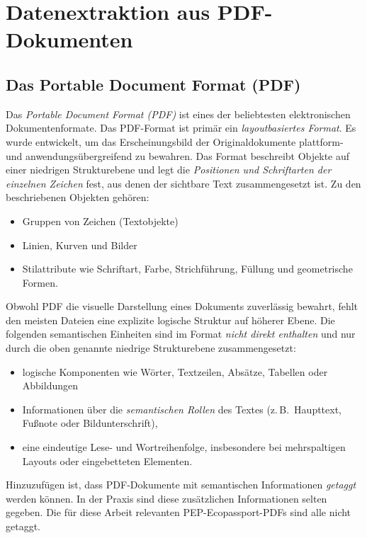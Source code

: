 \section{Datenextraktion aus PDF-Dokumenten}

\subsection{Das Portable Document Format (PDF)}

Das \emph{Portable Document Format (PDF)} ist eines der beliebtesten elektronischen Dokumentenformate.  
Das PDF-Format ist primär ein \emph{layoutbasiertes Format}. 
Es wurde entwickelt, um das Erscheinungsbild der Originaldokumente plattform- und anwendungsübergreifend zu bewahren. \cite{Lovegrove1995}
Das Format beschreibt Objekte auf einer niedrigen Strukturebene und legt die \emph{Positionen und Schriftarten der einzelnen Zeichen} fest, aus
denen der sichtbare Text zusammengesetzt ist. 
Zu den beschriebenen Objekten gehören:
\begin{itemize}
    \item Gruppen von Zeichen (Textobjekte)
    \item Linien, Kurven und Bilder
    \item Stilattribute wie Schriftart, Farbe, Strichführung, Füllung und geometrische Formen.
\end{itemize}
\cite{Bast2017}

Obwohl PDF die visuelle Darstellung eines Dokuments zuverlässig bewahrt, fehlt den meisten Dateien eine explizite logische Struktur auf höherer Ebene. 
Die folgenden semantischen Einheiten sind im Format \emph{nicht direkt enthalten} und nur durch die oben genannte niedrige Strukturebene zusammengesetzt:
\begin{itemize}
    \item logische Komponenten wie Wörter, Textzeilen, Absätze, Tabellen oder Abbildungen \cite{Chao2004}
    \item Informationen über die \emph{semantischen Rollen} des Textes (z.\,B.\ Haupttext, Fußnote oder Bildunterschrift), \cite{Bast2017}
    \item eine eindeutige Lese- und Wortreihenfolge, insbesondere bei mehrspaltigen Layouts oder eingebetteten Elementen. \cite{Bast2017}
\end{itemize}

Hinzuzufügen ist, dass PDF-Dokumente mit semantischen Informationen \emph{getaggt} werden können. In der Praxis sind diese zusätzlichen Informationen selten gegeben.
Die für diese Arbeit relevanten PEP-Ecopassport-PDFs sind alle nicht getaggt. \cite{Bast2017}

